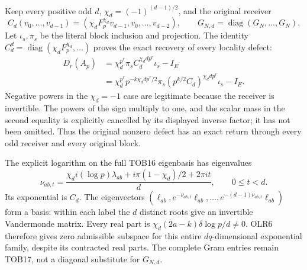 Keep every positive odd $d$, $\chi_d=(-1)^{(d-1)/2}$, and the
original receiver
\[
C_d(v_0,\ldots,v_{d-1})
=(\chi_d F_p^{\chi_d}v_{d-1},v_0,\ldots,v_{d-2}),\qquad
G_{N,d}=\operatorname{diag}(G_N,\ldots,G_N).
\tag{OLR18}
\]
Let $\iota_s,\pi_s$ be the literal block inclusion and projection.
The identity $C_d^d=\operatorname{diag}(\chi_dF_p^{\chi_d},\ldots)$
proves the exact recovery of every locality defect:
\[
\begin{split}
D_r(A_p)
&=\chi_d^{p^r}\pi_s C_d^{\chi_d d p^r}\iota_s-I_E\\
&=\chi_d^{p^r}p^{-k\chi_d d p^r/2}
       \pi_s(p^{k/2}C_d)^{\chi_d d p^r}\iota_s-I_E.
\end{split}
\tag{OLR19}
\]
Negative powers in the $\chi_d=-1$ case are legitimate because the
receiver is invertible. The powers of the sign multiply to one,
and the scalar mass in the second equality is explicitly cancelled
by its displayed inverse factor; it has not been omitted.
Thus the original nonzero defect has an exact return through every
odd receiver and every original block.

The explicit logarithm on the full TOB16 eigenbasis has eigenvalues
\[
\nu_{ab,t}=
\frac{\chi_di(\log p)\lambda_{ab}
       +i\pi(1-\chi_d)/2+2\pi it}{d},\qquad0\le t<d.
\tag{OLR20}
\]
Its exponential is $C_d$. The eigenvectors
$(\ell_{ab},e^{-\nu_{ab,t}}\ell_{ab},\ldots,
 e^{-(d-1)\nu_{ab,t}}\ell_{ab})$ form a basis: within each label
the $d$ distinct roots give an invertible Vandermonde matrix.
Every real part is $\chi_d(2a-k)\delta\log p/d\ne0$.
OLR6 therefore gives zero admissible subspace for this entire
$dq$-dimensional exponential family, despite its contracted real
parts. The complete Gram entries remain TOB17, not a diagonal
substitute for $G_{N,d}$.

